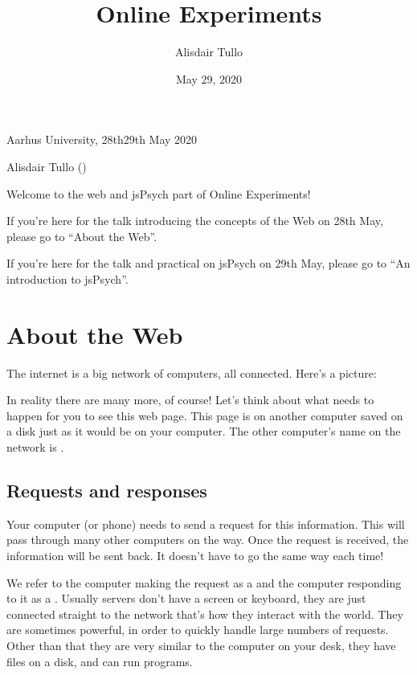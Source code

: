 \documentclass[letterpaper,10pt,english]{sphinxmanual}
\title{Online Experiments}
\date{May 29, 2020}
\author{Alisdair Tullo}
\begin{document}
\pagestyle{empty}
\sphinxmaketitle
\pagestyle{plain}
\sphinxtableofcontents
\pagestyle{normal}
\label{\detokenize{index::doc}}


\begin{center}Aarhus University, 28th\sphinxhyphen{}29th May 2020
\end{center}
\begin{center}Alisdair Tullo ()
\end{center}
Welcome to the web and jsPsych part of Online Experiments!

If you’re here for the talk introducing the concepts of the Web on 28th May,
please go to “About the Web”.

If you’re here for the talk and practical on jsPsych on 29th May, please go to
“An introduction to jsPsych”.




\chapter{About the Web}
\label{\detokenize{web:about-the-web}}\label{\detokenize{web::doc}}
The internet is a big network of computers, all connected. Here’s a picture:

\noindent{}

In reality there are many more, of course! Let’s think about what needs to happen
for you to see this web page. This page is on another computer \textendash{} saved on a disk
just as it would be on your computer. The other computer’s name on the
network is .


\section{Requests and responses}
\label{\detokenize{web:requests-and-responses}}
Your computer (or
phone) needs to send a request for this information. This will pass through
many other computers on the way. Once the request is received, the information
will be sent back. It doesn’t have to go the same way each time!

We refer to the computer making the request as a  and the computer
responding to it as a . Usually servers don’t have a screen or keyboard,
they are just connected straight to the network \textendash{} that’s how they interact with
the world. They are sometimes powerful, in order to quickly handle large numbers
of requests. Other than that they are very similar to the computer on your desk,
they have files on a disk, and can run programs.
\end{document}
